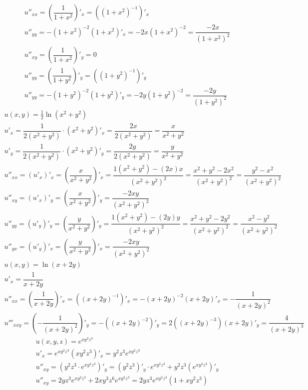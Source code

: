 \documentclass[a4paper,fleqn,12pt]{article}
\theoremstyle{definition}
\begin{document}
\begin{gather*}
u''_{xx} =\left( \dfrac{1}{1 + x^2} \right)'_x = ((1 + x^2)^{-1})'_x\\
u''_{yy}= -(1 + x^2)^{-2}(1+x^2)'_x = -2x(1 + x^2)^{-2}  = \dfrac{-2x}{(1 + x^2)^2}\\
u''_{xy} =\left( \dfrac{1}{1 + x^2} \right)'_y = 0 \\
u''_{yy} =\left( \dfrac{1}{1 + y^2} \right)'_y = ((1 + y^2)^{-1})'_y\\
u''_{yy}= -(1 + y^2)^{-2}(1+y^2)'_y = -2y(1 + y^2)^{-2}  = \dfrac{-2y}{(1 + y^2)^2}
\end{gather*}
\begin{gather*}
u(x,y) = \frac{1}{2} \ln{(x^2 + y^2)}\\
u'_x = \dfrac{1}{2(x^2 + y^2)} \cdot (x^2 + y^2)'_x = \dfrac{2x}{2(x^2 + y^2)} = \dfrac{x}{x^2 + y^2}\\
u'_y = \dfrac{1}{2(x^2 + y^2)} \cdot (x^2 + y^2)'_y = \dfrac{2y}{2(x^2 + y^2)} = \dfrac{y}{x^2 + y^2}\\
u''_{xx} = (u'_x)'_x = \left( \dfrac{x}{x^2 + y^2} \right)'_x =  \dfrac{1(x^2 + y^2) - (2x)x}{(x^2 + y^2)^2} = \dfrac{x^2 + y^2 - 2x^2}{(x^2 + y^2)^2} = \dfrac{ y^2 - x^2}{(x^2 + y^2)^2}\\
u''_{xy} = (u'_x)'_y = \left( \dfrac{x}{x^2 + y^2} \right)'_y =  \dfrac{- 2xy}{(x^2 + y^2)^2}\\
u''_{yy} = (u'_y)'_y = \left( \dfrac{y}{x^2 + y^2} \right)'_y = \dfrac{1(x^2 + y^2) - (2y)y}{(x^2 + y^2)^2} = \dfrac{x^2 + y^2 - 2y^2}{(x^2 + y^2)^2} = \dfrac{x^2 - y^2}{(x^2 + y^2)^2}\\
u''_{yx} = (u'_y)'_x = \left( \dfrac{y}{x^2 + y^2} \right)'_x = \dfrac{- 2xy}{(x^2 + y^2)^2}
\end{gather*}
\begin{gather*}
u(x,y) = \ln{(x + 2y)}\\
u'_x = \dfrac{1}{x + 2y}\\
u''_{xx} = \left( \dfrac{1}{x + 2y} \right)'_x = ((x+2y)^{-1})'_x = -(x+2y)^{-2}(x+2y)'_x = - \dfrac{1}{(x+2y)^2} \\
u'''_{xxy} = \left( -\dfrac{1}{(x + 2y)^2} \right)'_y = -((x+2y)^{-2})'_y = 2((x+2y)^{-3})(x+2y)'_y = \dfrac{4}{(x+2y)^3}
\end{gather*}
\begin{gather*}
u(x,y,z) = e^{xy^2z^3}\\
u'_x =  e^{xy^2z^3}(xy^2z^3)'_x = y^2z^3e^{xy^2z^3}\\
u''_{xy} = (y^2z^3 \cdot e^{xy^2z^3})'_y = (y^2z^3)'_y \cdot e^{xy^2z^3} + y^2z^3 (e^{xy^2z^3})'_y\\
u''_{xy} = 2yz^3e^{xy^2z^3} + 2xy^3z^6e^{xy^2z^3} =  2yz^3e^{xy^2z^3} (1 + xy^2z^3)
\end{gather*}
\end{document}

